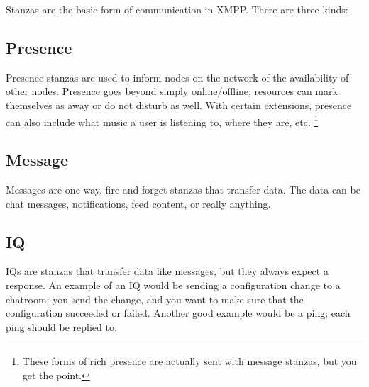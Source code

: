 Stanzas are the basic form of communication in XMPP.  There are three kinds:

\pause
\subsection*{Presence}

Presence stanzas are used to inform nodes on the network of the availability of
other nodes.  Presence goes beyond simply online/offline; resources can mark themselves
as away or do not disturb as well.  With certain extensions, presence can also include
what music a user is listening to, where they are, etc.
\footnote{These forms of rich presence are actually sent with message stanzas, but you get the point.}

\pause
\subsection*{Message}

Messages are one-way, fire-and-forget stanzas that transfer data.  The data can be chat messages, notifications,
feed content, or really anything.

\pause
\subsection*{IQ}

IQs are stanzas that transfer data like messages, but they always expect a response.  An example of an IQ would be
sending a configuration change to a chatroom; you send the change, and you want to make sure that the configuration
succeeded or failed.  Another good example would be a ping; each ping should be replied to.
